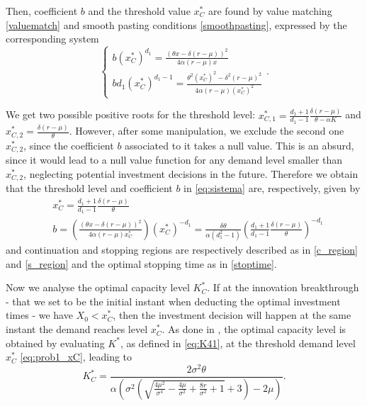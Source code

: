 Then, coefficient $b$ and the threshold value $x_C^*$ are found by value matching \eqref{valuematch} and smooth pasting conditions \eqref{smoothpasting}, expressed by the corresponding system
\begin{equation}
\begin{cases} b (x_C^*)^{d_1}=\frac{(\theta x -\delta (r-\mu))^2}{4 \alpha (r-\mu) x} \\
b d_1(x_C^*)^{d_1-1}=\frac{\theta^2 (x_C^*)^2 -\delta^2 (r-\mu)^2}{4 \alpha (r-\mu) (x_C^*)^2}
\end{cases}.
\label{eq:sistema3}
\end{equation}

We get two possible positive roots for the threshold level: $x^*_{C,1}=\frac{d_1+1}{d_1-1} \frac{ \delta (r-\mu)}{\theta-\alpha K}$ and $x^*_{C,2}=\frac{\delta  (r-\mu )}{\theta }$. However, after some manipulation, we exclude the second one $x^*_{C,2}$, since the coefficient $b$ associated to it takes a null value. This is an absurd, since it would lead to a null value function for any demand level smaller than $x^*_{C,2}$, neglecting potential investment decisions in the future.
Therefore we obtain that the threshold level and coefficient $b$ in \eqref{eq:sistema} are, respectively, given by
\begin{align}
 &x_C^*=\frac{d_1+1}{d_1-1} \frac{ \delta (r-\mu)}{\theta} \label{eq:prob1_xC}\\
 &b=\left( \frac{(\theta x -\delta (r-\mu))^2}{4 \alpha (r-\mu) x_C^*} \right)(x_C^*)^{-d_1} = \frac{\delta \theta}{\alpha (d_1^2-1)} \left( \frac{d_1+1}{d_1-1} \frac{ \delta (r-\mu)}{\theta} \right)^{-d_1} \nonumber
\end{align}
and continuation and stopping regions are respectively described as in \eqref{c_region} and \eqref{s_region} and the optimal stopping time as in \eqref{stoptime}.

Now we analyse the optimal capacity level $K^*_C$. If at the innovation breakthrough - that we set to be the initial instant when deducting the optimal investment times - we have $X_0<x^*_C$, then the investment decision will happen at the same instant the demand reaches level $x^*_C$. 
As done in \cite{huis:cap}, the optimal capacity level is obtained by evaluating $K^*$, as defined in \eqref{eq:K41}, at the threshold demand level $x^*_C$ \eqref{eq:prob1_xC}, leading to
\begin{equation}
K^*_C=\frac{2 \sigma ^2 \theta}{\alpha \left(\sigma ^2 \left(\sqrt{\frac{4 \mu ^2}{\sigma ^4}-\frac{4 \mu }{\sigma ^2}+\frac{8 r}{\sigma ^2}+1}+3\right)-2 \mu \right)}.
\label{prob1:K*}
\end{equation}

